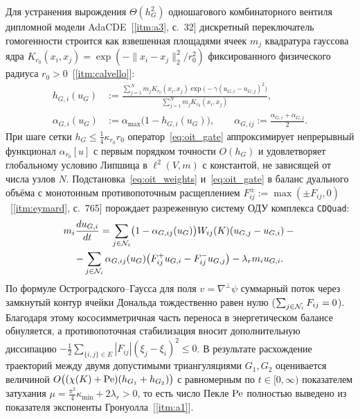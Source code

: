 Для устранения вырождения $\Theta(h_G^2)$ одношагового комбинаторного вентиля дипломной модели AdaCDE~[\ref{itm:a3}, с.~32] дискретный переключатель гомогенности строится как взвешенная площадями ячеек $m_j$ квадратура гауссова ядра $K_{r_0}(x_i,x_j)=\exp(-\|x_i-x_j\|_2^2/r_0^2)$ фиксированного физического радиуса $r_0>0$~[\ref{itm:calvello}]:
\begin{equation}\label{eq:oit_gate}
\begin{aligned}
h_{G,i}(u_G) &:= \frac{\sum_{j=1}^N m_j K_{r_0}(x_i,x_j)\exp\!\bigl(-\gamma(u_{G,i}-u_{G,j})^2\bigr)}{\sum_{j=1}^N m_j K_{r_0}(x_i,x_j)},\\
\alpha_{G,i}(u_G) &:= \alpha_{\max}\bigl(1-h_{G,i}(u_G)\bigr), \qquad \alpha_{G,ij}:=\frac{\alpha_{G,i}+\alpha_{G,j}}{2}.
\end{aligned}
\end{equation}
При шаге сетки $h_G\le \frac{1}{4}\kappa_{r_0}r_0$ оператор~\eqref{eq:oit_gate} аппроксимирует непрерывный функционал $\alpha_{r_0}[u]$ с первым порядком точности $O(h_G)$ и удовлетворяет глобальному условию Липшица в $\ell^2(V,m)$ с константой, не зависящей от числа узлов $N$. Подстановка~\eqref{eq:oit_weights} и~\eqref{eq:oit_gate} в баланс дуального объёма с монотонным противопоточным расщеплением $F_{ij}^\pm:=\max(\pm F_{ij},0)$~[\ref{itm:eymard}, с.~765] порождает разреженную систему ОДУ комплекса \texttt{CDQuad}:
\begin{multline}\label{eq:oit_ode}
m_i\frac{d u_{G,i}}{dt} = \sum_{j\in\mathcal{N}_i}\bigl(1-\alpha_{G,ij}(u_G)\bigr)W_{ij}(K)(u_{G,j}-u_{G,i}) - {}\\
- \sum_{j\in\mathcal{N}_i}\alpha_{G,ij}(u_G)\bigl(F_{ij}^+ u_{G,i} - F_{ij}^- u_{G,j}\bigr) - \lambda_r m_i u_{G,i}.
\end{multline}
По формуле Остроградского--Гаусса для поля $v=\nabla^\perp\psi$ суммарный поток через замкнутый контур ячейки Дональда тождественно равен нулю ($\sum_{j\in\mathcal{N}_i}F_{ij}=0$). Благодаря этому кососимметричная часть переноса в энергетическом балансе обнуляется, а противопоточная стабилизация вносит дополнительную диссипацию $-\frac{1}{2}\sum_{\{i,j\}\in E}|F_{ij}|(\xi_j-\xi_i)^2\le 0$. В результате расхождение траекторий между двумя допустимыми триангуляциями $G_1,G_2$ оценивается величиной $O\bigl((\chi(K)+\operatorname{Pe})(h_{G_1}+h_{G_2})\bigr)$ с равномерным по $t\in[0,\infty)$ показателем затухания $\mu=\frac{\pi^2}{4}\kappa_{\min}+2\lambda_r>0$, то есть число Пекле $\operatorname{Pe}$ полностью выведено из показателя экспоненты Гронуолла~[\ref{itm:a1}].

